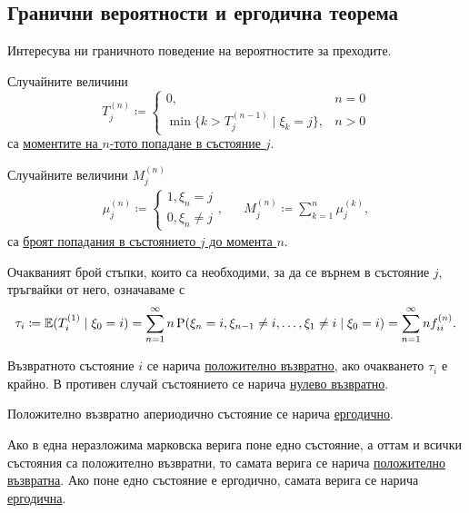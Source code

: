 \documentclass[numbers=endperiod, DIV=15, bibliography=totocnumbered]{scrartcl}
\begin{document}
\subsection{Гранични вероятности и ергодична теорема}

Интересува ни граничното поведение на вероятностите за преходите.

\begin{definition}
  Случайните величини
  \begin{displaymath}
    T_j^{(n)}
    \coloneqq
    \begin{cases}
      0, &n = 0 \\
      \min \{ k > T_j^{(n-1)} \mid \xi_k = j \}, &n > 0
    \end{cases}
  \end{displaymath}
  са \uline{моментите на $n$-тото попадане в състояние $j$}.

  Случайните величини $M_j^{(n)}$
  \begin{align*}
    \mu_j^{(n)}
    \coloneqq
    \begin{cases}
      1, \xi_n = j \\
      0, \xi_n \neq j
    \end{cases},
    &&
    M_j^{(n)}
    \coloneqq
    \sum_{k=1}^n \mu_j^{(k)},
  \end{align*}
  са \uline{броят попадания в състоянието $j$ до момента $n$}.

  Очакваният брой стъпки, които са необходими, за да се върнем в състояние $j$, тръгвайки от него, означаваме с
  \begin{displaymath}
    \tau_i
    \coloneqq
    \mathbb{E}(T_i^{(1)} \mid \xi_0 = i)
    =
    \sum_{n=1}^\infty n \operatorname{P}(\xi_n = i, \xi_{n-1} \neq i, \ldots, \xi_1 \neq i \mid \xi_0 = i)
    =
    \sum_{n=1}^\infty n f^{(n)}_{ii}.
  \end{displaymath}
\end{definition}

\begin{definition}
  Възвратното състояние $i$ се нарича \uline{положително възвратно}, ако очакването $\tau_i$ е крайно. В противен случай състоянието се нарича \uline{нулево възвратно}.

  Положително възвратно апериодично състояние се нарича \uline{ергодично}.

  Ако в една неразложима марковска верига поне едно състояние, а оттам и всички състояния са положително възвратни, то самата верига се нарича \uline{положително възвратна}. Ако поне едно състояние е ергодично, самата верига се нарича \uline{ергодична}.
\end{definition}
\end{document}
